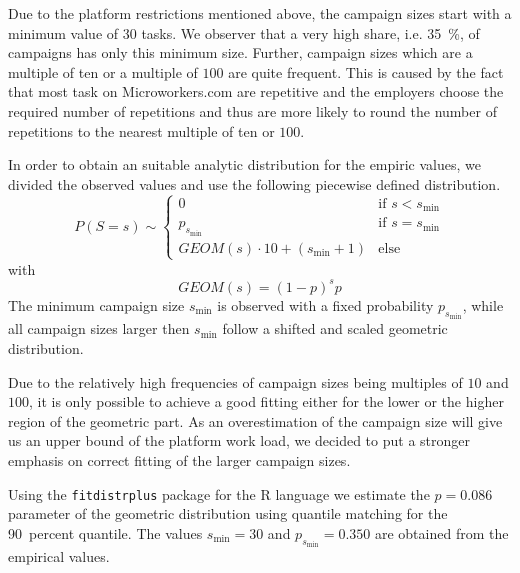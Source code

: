 Due to the platform restrictions mentioned above, the campaign sizes start with a minimum value of \(30\) tasks.
We observer that a very high share, i.e. \SI{35}{\percent}, of campaigns has only this minimum size.
Further, campaign sizes which are a multiple of ten or a multiple of \(100\) are quite frequent.
This is caused by the fact that most task on Microworkers.com are repetitive and the employers choose the required number of repetitions and thus are more likely to round the number of repetitions to the nearest multiple of ten or \(100\).

In order to obtain an suitable analytic distribution for the empiric values, we divided the observed values and use the following piecewise defined distribution.
\begin{equation*}
P(S=s) \sim
\begin{cases}
  0 & \text{if } s < s_{\min}\\
  p_{s_{\min}} & \text{if } s=s_{\min} \\
  GEOM(s) \cdot 10 + (s_{\min}+1) & \text{else}
\end{cases}
\end{equation*}
with 
\begin{equation*}
GEOM(s) = {(1-p)}^s p
\end{equation*}
The minimum campaign size \(s_{\min}\) is observed with a fixed probability \(p_{s_{\min}}\), while all campaign sizes larger then \(s_{\min}\) follow a shifted and scaled geometric distribution.

Due to the relatively high frequencies of campaign sizes being multiples of \(10\) and \(100\), it is only possible to achieve a good fitting either for the lower or the higher region of the geometric part.
As an overestimation of the campaign size will give us an upper bound of the platform work load, we decided to put a stronger emphasis on correct fitting of the larger campaign sizes.

Using the \texttt{fitdistrplus} package for the R language we estimate the \(p=0.086\) parameter of the geometric distribution using quantile matching for the \SI{90}{percent} quantile.
The values \(s_{\min}=30\) and \(p_{s_{\min}}=0.350\) are obtained from the empirical values.

